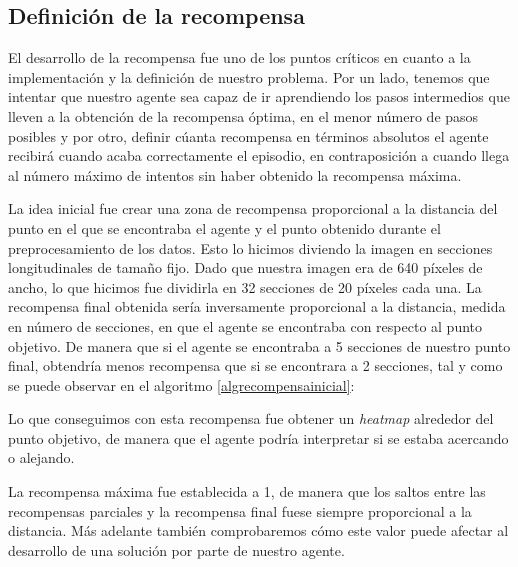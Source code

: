 \subsection{Definición de la recompensa}
\label{definicion-de-recompensa}

El desarrollo de la recompensa fue uno de los puntos críticos en cuanto a la implementación y la definición de nuestro problema. Por un lado, tenemos que intentar que nuestro agente sea capaz de ir aprendiendo los pasos intermedios que lleven a la obtención de la recompensa óptima, en el menor número de pasos posibles y por otro, definir cúanta recompensa en términos absolutos el agente recibirá cuando acaba correctamente el episodio, en contraposición a cuando llega al número máximo de intentos sin haber obtenido la recompensa máxima.
\medskip

La idea inicial fue crear una zona de recompensa proporcional a la distancia del punto en el que se encontraba el agente y el punto obtenido durante el preprocesamiento de los datos. Esto lo hicimos diviendo la imagen en secciones longitudinales de tamaño fijo. Dado que nuestra imagen era de 640 píxeles de ancho, lo que hicimos fue dividirla en 32 secciones de 20 píxeles cada una. La recompensa final obtenida sería inversamente proporcional a la distancia, medida en número de secciones, en que el agente se encontraba con respecto al punto objetivo. De manera que si el agente se encontraba a 5 secciones de nuestro punto final, obtendría menos recompensa que si se encontrara a 2 secciones, tal y como se puede observar en el algoritmo \ref{algrecompensainicial}:
\medskip
\vspace{3ex}

\vspace{3ex}

Lo que conseguimos con esta recompensa fue obtener un \textit{heatmap} alrededor del punto objetivo, de manera que el agente podría interpretar si se estaba acercando o alejando. 
\medskip

La recompensa máxima fue establecida a 1, de manera que los saltos entre las recompensas parciales y la recompensa final fuese siempre proporcional a la distancia. Más adelante también comprobaremos cómo este valor puede afectar al desarrollo de una solución por parte de nuestro agente.
\medskip

